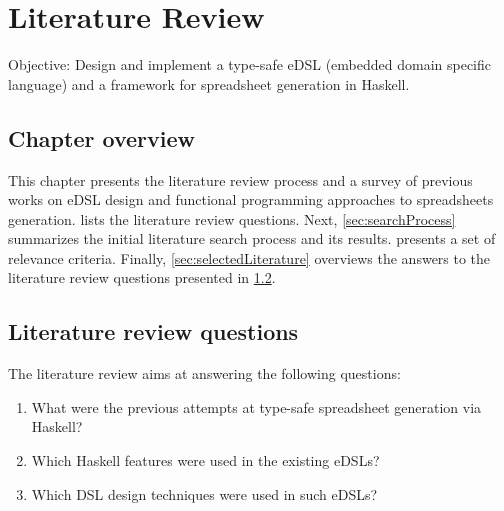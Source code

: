 \chapter{Literature Review}
\label{chap:lr}

Objective: Design and implement a type-safe eDSL (embedded domain specific language) and a framework for spreadsheet generation in Haskell.

\section{Chapter overview}
This chapter presents the literature review process and a survey of previous works on eDSL design and functional programming approaches to spreadsheets generation.  lists the literature review questions. Next, \cref{sec:searchProcess} summarizes the initial literature search process and its results.  presents a set of relevance criteria. Finally, \cref{sec:selectedLiterature} overviews the answers to the literature review questions presented in \cref{sec:research_questions}.

\section{Literature review questions} \label {sec:research_questions}
The literature review aims at answering the following questions:
\begin{enumerate}[noitemsep]
    \item What were the previous attempts at type-safe spreadsheet generation via Haskell?
    \item Which Haskell features were used in the existing eDSLs?
    \item Which DSL design techniques were used in such eDSLs?
\end{enumerate}

